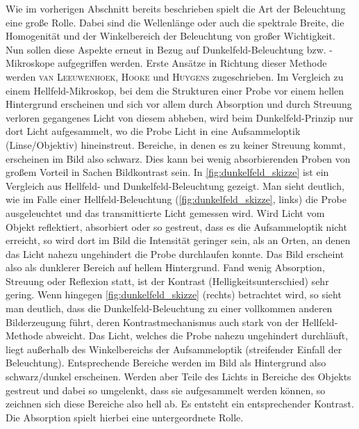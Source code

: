 \documentclass[english, ngerman]{scrartcl}
\begin{document}
Wie im vorherigen Abschnitt bereits beschrieben spielt die Art der Beleuchtung eine große Rolle. Dabei sind die Wellenlänge oder auch die spektrale Breite, die Homogenität und der Winkelbereich der Beleuchtung von großer Wichtigkeit. Nun sollen diese Aspekte erneut in Bezug auf Dunkelfeld-Beleuchtung bzw. -Mikroskope aufgegriffen werden. Erste Ansätze in Richtung dieser Methode werden \textsc{van Leeuwenhoek}, \textsc{Hooke} und \textsc{Huygens} zugeschrieben. Im Vergleich zu einem Hellfeld-Mikroskop, bei dem die Strukturen einer Probe vor einem hellen Hintergrund erscheinen und sich vor allem durch Absorption und durch Streuung verloren gegangenes Licht von diesem abheben, wird beim Dunkelfeld-Prinzip nur dort Licht aufgesammelt, wo die Probe Licht in eine Aufsammeloptik (Linse/Objektiv) hineinstreut. Bereiche, in denen es zu keiner Streuung kommt, erscheinen im Bild also schwarz. Dies kann bei wenig absorbierenden Proben von großem Vorteil in Sachen Bildkontrast sein. In \autoref{fig:dunkelfeld_skizze} ist ein Vergleich aus Hellfeld- und Dunkelfeld-Beleuchtung gezeigt. Man sieht deutlich, wie im Falle einer Hellfeld-Beleuchtung (\autoref{fig:dunkelfeld_skizze}, links) die Probe ausgeleuchtet und das transmittierte Licht gemessen wird. Wird Licht vom Objekt reflektiert, absorbiert oder so gestreut, dass es die Aufsammeloptik nicht erreicht, so wird dort im Bild die Intensität geringer sein, als an Orten, an denen das Licht nahezu ungehindert die Probe durchlaufen konnte. Das Bild erscheint also als dunklerer Bereich auf hellem Hintergrund. Fand wenig Absorption, Streuung oder Reflexion statt, ist der Kontrast (Helligkeitsunterschied) sehr gering. Wenn hingegen \autoref{fig:dunkelfeld_skizze} (rechts) betrachtet wird, so sieht man deutlich, dass die Dunkelfeld-Beleuchtung zu einer vollkommen anderen Bilderzeugung führt, deren Kontrastmechanismus auch stark von der Hellfeld-Methode abweicht. Das Licht, welches die Probe nahezu ungehindert durchläuft, liegt außerhalb des Winkelbereichs der Aufsammeloptik (streifender Einfall der Beleuchtung). Entsprechende Bereiche werden im Bild als Hintergrund also schwarz/dunkel erscheinen. Werden aber Teile des Lichts in Bereiche des Objekts gestreut und dabei so umgelenkt, dass sie aufgesammelt werden können, so zeichnen sich diese Bereiche also hell ab. Es entsteht ein entsprechender Kontrast. Die Absorption spielt hierbei eine untergeordnete Rolle.
%
\end{document}
